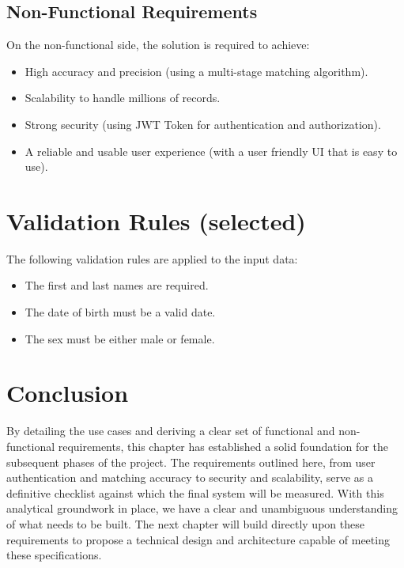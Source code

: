 \subsection{Non-Functional Requirements}
On the non-functional side, the solution is required to achieve:
\begin{itemize}
    \item High accuracy and precision (using a multi-stage matching algorithm).
    \item Scalability to handle millions of records.
    \item Strong security (using JWT Token for authentication and authorization).
    \item A reliable and usable user experience (with a user friendly UI that is easy to use).
\end{itemize}

\section{Validation Rules (selected)}
The following validation rules are applied to the input data:
\begin{itemize}
    \item The first and last names are required.
    \item The date of birth must be a valid date.
    \item The sex must be either male or female.
\end{itemize}


\section{Conclusion}
By detailing the use cases and deriving a clear set of functional and non-functional requirements, this chapter has established a solid foundation for the subsequent phases of the project. The requirements outlined here, from user authentication and matching accuracy to security and scalability, serve as a definitive checklist against which the final system will be measured. With this analytical groundwork in place, we have a clear and unambiguous understanding of what needs to be built. The next chapter will build directly upon these requirements to propose a technical design and architecture capable of meeting these specifications.